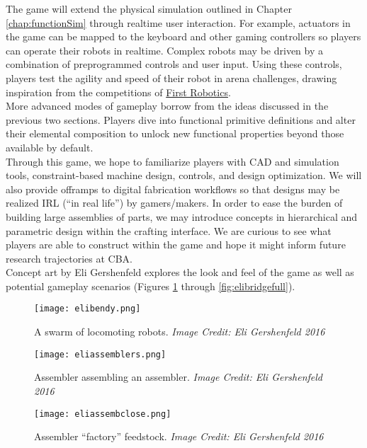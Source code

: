 {The game will extend the physical simulation outlined in Chapter \ref{chap:functionSim} through realtime user interaction.  For example, actuators in the game can be mapped to the keyboard and other gaming controllers so players can operate their robots in realtime.  Complex robots may be driven by a combination of preprogrammed controls and user input.  Using these controls, players test the agility and speed of their robot in arena challenges, drawing inspiration from the competitions of \href{http://www.firstinspires.org/robotics/frc}{First Robotics}.\\

More advanced modes of gameplay borrow from the ideas discussed in the previous two sections.  Players dive into functional primitive definitions and alter their elemental composition to unlock new functional properties beyond those available by default.\\

Through this game, we hope to familiarize players with CAD and simulation tools, constraint-based machine design, controls, and design optimization.  We will also provide offramps to digital fabrication workflows so that designs may be realized IRL (``in real life'') by gamers/makers.  In order to ease the burden of building large assemblies of parts, we may introduce concepts in hierarchical and parametric design within the crafting interface.  We are curious to see what players are able to construct within the game and hope it might inform future research trajectories at CBA.\\

Concept art by Eli Gershenfeld explores the look and feel of the game as well as potential gameplay scenarios (Figures \ref{fig:elibendy} through \ref{fig:elibridgefull}).

\clearpage

\begin{figure}
  \texttt{[image: elibendy.png]}
  \caption{A swarm of locomoting robots.  \textit{Image Credit: Eli Gershenfeld 2016}}
  \label{fig:elibendy}
\end{figure}

\begin{figure}
  \texttt{[image: eliassemblers.png]}
  \caption{Assembler assembling an assembler.  \textit{Image Credit: Eli Gershenfeld 2016}}
  \label{fig:eliassemblers}
\end{figure}

\begin{figure}
  \texttt{[image: eliassembclose.png]}
  \caption{Assembler ``factory'' feedstock.  \textit{Image Credit: Eli Gershenfeld 2016}}
  \label{fig:eliassembclose}
\end{figure}

}
